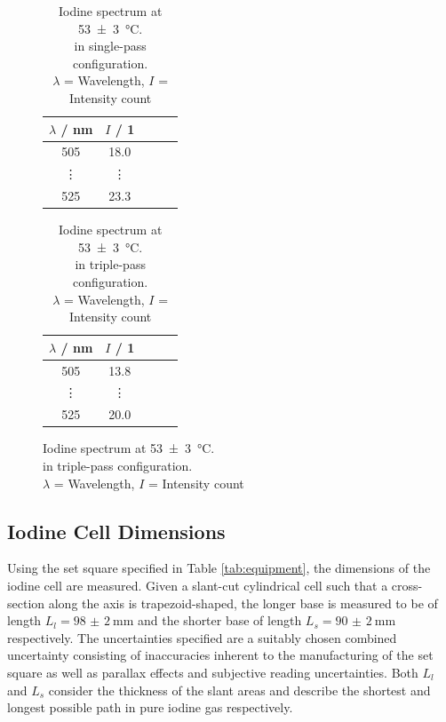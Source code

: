 \begin{figure}[H]
    \centering
    \begin{minipage}[b]{0.48\textwidth}
        \centering
        \begin{table}[H]
            \centering
            \caption{Iodine spectrum at \SI{53(3)}{\celsius}. \\in single-pass configuration. \\
            $\lambda$ = Wavelength, $I$ = Intensity count}
            \label{tab:execution:iodine:single:3}
            \begin{tabular}{ccccc}
            \hline
            $\lambda$ / nm & $I$ / 1 \\ \hline
            505  & 18.0  \\
            \vdots & \vdots  \\
            525 & 23.3 \\ \hline
            \end{tabular}
        \end{table}
    \end{minipage}
    \hfill
     \begin{minipage}[b]{0.48\textwidth}
        \centering
        \begin{table}[H]
            \centering
            \caption{Iodine spectrum at \SI{53(3)}{\celsius}. \\in triple-pass configuration. \\
            $\lambda$ = Wavelength, $I$ = Intensity count}
            \label{tab:execution:iodine:triple}
            \begin{tabular}{ccccc}
            \hline
            $\lambda$ / nm & $I$ / 1 \\ \hline
            505  & 13.8  \\
            \vdots & \vdots  \\
            525 & 20.0 \\ \hline
            \end{tabular}
        \end{table}
    \end{minipage}
\end{figure}

\subsection{Iodine Cell Dimensions}
\label{sec:execution:iodine-cell-dimensions}

Using the set square specified in Table \ref{tab:equipment}, the dimensions of the iodine cell are measured. Given a slant-cut cylindrical cell such that a cross-section along the axis is trapezoid-shaped, the longer base is measured to be of length $L_l = \SI{98(2)}{\mm}$ and the shorter base of length $L_s = \SI{90(2)}{\mm}$ respectively. The uncertainties specified are a suitably chosen combined uncertainty consisting of inaccuracies inherent to the manufacturing of the set square as well as parallax effects and subjective reading uncertainties. Both $L_l$ and $L_s$ consider the thickness of the slant areas and describe the shortest and longest possible path in pure iodine gas respectively.




